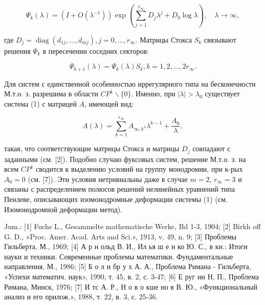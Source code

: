 \documentclass[10pt]{article}
\begin{document}
\[

\Psi_{k}(\lambda)=\left(I+O\left(\lambda^{-1}\right)\right) \exp \left(\sum_{j=1}^{r_{\infty}} D_{j} \lambda^{j}+D_{0} \log \lambda\right), \quad \lambda \rightarrow \infty,

\]



где $D_{j}=\operatorname{diag}\left(d_{1 j}, \ldots, d_{m j}\right), j=0, \ldots, r_{\infty}$. Матрицы Стокса $S_{k}$ связывают решения $\Psi_{k}$ в пересечении соседних секторов:



\[

\Psi_{k+1}(\lambda)=\Psi_{k}(\lambda) S_{k}, k=1,2, \ldots, 2 r_{\infty} .

\]



Для систем с единственной особенностью иррегулярного типа на бесконечности М.т.о. з. разрешима в области $C P^{1} \backslash\{0\}$. Именно, при $|\lambda|>\lambda_{0}$ существует система (1) с матрицей $A$, имеющей вид:



\[

A(\lambda)=\sum_{k=1}^{r_{\infty}} A_{\infty, k^{\lambda}} \lambda^{k-1}+\frac{A_{0}}{\lambda},

\]



такая, что соответствующие матрицы Стокса и матрицы $D_{j}$ совпадают с заданными (см. [2]). Подобно случаю фуксовых систем, решение М.т.о. з. на всем $C P^{1}$ сводится к выделению условий на группу монодромии, при к-рых $A_{0}=0$ (см. [7]). Эти условия нетривиальны даже в случае $m=2$, $r_{\infty}=3$ и связаны с распределением полюсов решений нелинейных уравнений типа Пенлеве, описывающих изомонодромные деформации системы (1) (см. Изомонодромной деформации метод).



Jum.: [1] Fuchs L., Gesammelte mathematische Werke, Bd 1-3, 1904; [2] Birkh off G. D., «Proc. Amer. Acad. Arts and Sci.», 1913, v. 49, n. 9; [3] Проблемы Гильберта, М., 1969; [4] А р н ольд В. И., Ил ья ш е н ко Ю. С., в кн.: Итоги науки и техники. Современные проблемы математики. Фундаментальные направления, М., 1986; [5] Б о л и бр у х А. А., Проблема Римана - Гильберта, «Успехи математич. наук», 1990, т. 45, в. 2, с. 3-47; [6] Е руг ин Н. П., Проблема Римана, Минск, 1976; [7] И тс А. Р., Н о в о кше но в В. Ю., «Функциональный анализ и его прилож.», 1988, т. 22, в. 3, с. 25-36.
\end{document}
